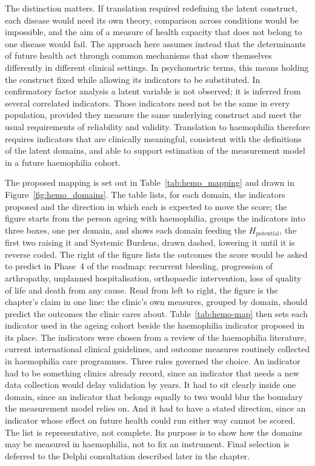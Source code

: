 The distinction matters. If translation required redefining the latent construct, each disease would need its own theory, comparison across conditions would be impossible, and the aim of a measure of health capacity that does not belong to one disease would fail. The approach here assumes instead that the determinants of future health act through common mechanisms that show themselves differently in different clinical settings. In psychometric terms, this means holding the construct fixed while allowing its indicators to be substituted. In confirmatory factor analysis a latent variable is not observed; it is inferred from several correlated indicators. Those indicators need not be the same in every population, provided they measure the same underlying construct and meet the usual requirements of reliability and validity. Translation to haemophilia therefore requires indicators that are clinically meaningful, consistent with the definitions of the latent domains, and able to support estimation of the measurement model in a future haemophilia cohort.

The proposed mapping is set out in Table~\ref{tab:hemo_mapping} and drawn in Figure~\ref{fig:hemo_domains}. The table lists, for each domain, the indicators proposed and the direction in which each is expected to move the score; the figure starts from the person ageing with haemophilia, groups the indicators into three boxes, one per domain, and shows each domain feeding the $H_{\text{potential}}$, the first two raising it and Systemic Burdens, drawn dashed, lowering it until it is reverse coded. The right of the figure lists the outcomes the score would be asked to predict in Phase~4 of the roadmap: recurrent bleeding, progression of arthropathy, unplanned hospitalisation, orthopaedic intervention, loss of quality of life and death from any cause. Read from left to right, the figure is the chapter's claim in one line: the clinic's own measures, grouped by domain, should predict the outcomes the clinic cares about. Table~\ref{tab:hemo-map} then sets each indicator used in the ageing cohort beside the haemophilia indicator proposed in its place. The indicators were chosen from a review of the haemophilia literature, current international clinical guidelines, and outcome measures routinely collected in haemophilia care programmes. Three rules governed the choice. An indicator had to be something clinics already record, since an indicator that needs a new data collection would delay validation by years. It had to sit clearly inside one domain, since an indicator that belongs equally to two would blur the boundary the measurement model relies on. And it had to have a stated direction, since an indicator whose effect on future health could run either way cannot be scored. The list is representative, not complete. Its purpose is to show how the domains may be measured in haemophilia, not to fix an instrument. Final selection is deferred to the Delphi consultation described later in the chapter.


